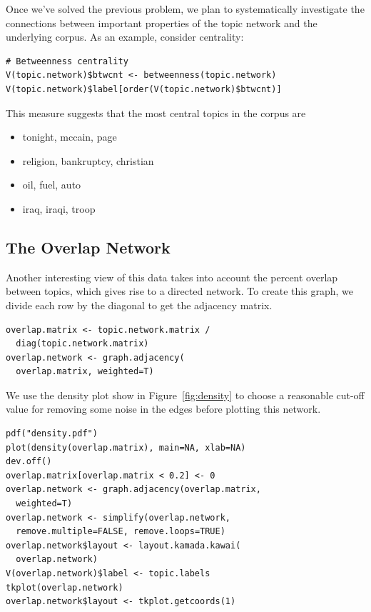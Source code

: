 \documentclass[%
	final,
	notitlepage,
	narroweqnarray,
	inline,
	]{ieee}
\begin{document}
Once we've solved the previous problem, we plan to systematically investigate the connections between important
properties of the topic network and the underlying corpus.  As an example, consider
centrality:

\begin{verbatim}
# Betweenness centrality
V(topic.network)$btwcnt <- betweenness(topic.network)
V(topic.network)$label[order(V(topic.network)$btwcnt)]
\end{verbatim}

\noindent This measure suggests that the most central topics in the corpus are
\begin{itemize}
 \item tonight, mccain, page
 \item religion, bankruptcy, christian
 \item oil, fuel, auto
 \item iraq, iraqi, troop
\end{itemize}


\subsection{The Overlap Network}

\PARstart Another interesting view of this data takes into account the 
percent overlap between topics, which gives rise to a directed network.
To create this graph, we divide each row by the diagonal to get the
adjacency matrix.

\begin{verbatim}
overlap.matrix <- topic.network.matrix / 
  diag(topic.network.matrix)
overlap.network <- graph.adjacency(
  overlap.matrix, weighted=T)
\end{verbatim}

We use the density plot show in Figure~\ref{fig:density} to choose
a reasonable cut-off value for removing some noise in the edges before plotting this
network.  

\begin{verbatim}
pdf("density.pdf")
plot(density(overlap.matrix), main=NA, xlab=NA)
dev.off()
overlap.matrix[overlap.matrix < 0.2] <- 0
overlap.network <- graph.adjacency(overlap.matrix, 
  weighted=T)
overlap.network <- simplify(overlap.network, 
  remove.multiple=FALSE, remove.loops=TRUE)
overlap.network$layout <- layout.kamada.kawai(
  overlap.network)
V(overlap.network)$label <- topic.labels
tkplot(overlap.network)
overlap.network$layout <- tkplot.getcoords(1)
\end{verbatim}
\end{document}
